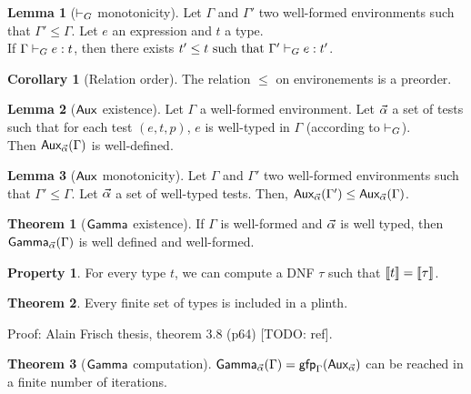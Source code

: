 \documentclass[a4paper]{article}
\theoremstyle{definition}
\newtheorem{theorem}{Theorem}
\newtheorem{lemma}{Lemma}
\newtheorem{property}{Property}
\newtheorem{corollary}{Corollary}
\begin{document}
        \begin{lemma}[$\vdash_G$ monotonicity]
          Let $\Gamma$ and $\Gamma'$ two well-formed environments such that $\Gamma' \leq \Gamma$.
          Let $e$ an expression and $t$ a type.\\
          If $\Gamma \vdash_G e : t$, then there exists $t'\leq t \text{ such that } \Gamma' \vdash_G e : t'$.
        \end{lemma}

        \begin{corollary}[Relation order]
          The relation $\leq$ on environements is a preorder.
        \end{corollary}

        \begin{lemma}[$\textsf{Aux}_{} $ existence]
          Let $\Gamma$ a well-formed environment.
          Let $\vec \alpha$ a set of tests such that for each test $(e,t,p)$, $e$ is well-typed in $\Gamma$ (according to $\vdash_G$).\\
          Then $\textsf{Aux}_{\vec \alpha}(\Gamma)$ is well-defined.
        \end{lemma}

        \begin{lemma}[$\textsf{Aux}_{}$ monotonicity]
          Let $\Gamma$ and $\Gamma'$ two well-formed environments such that $\Gamma' \leq \Gamma$.
          Let $\vec \alpha$ a set of well-typed tests. Then, $\textsf{Aux}_{\vec \alpha}(\Gamma') \leq \textsf{Aux}_{\vec \alpha}(\Gamma)$.
        \end{lemma}

        \begin{theorem}[$\textsf{Gamma}_{}$ existence]
            If $\Gamma$ is well-formed and $\vec \alpha$ is well typed, then $\textsf{Gamma}_{\vec \alpha}(\Gamma)$ is well defined and well-formed.
        \end{theorem}

        \begin{property}
          For every type $t$, we can compute a DNF $\tau$ such that ${\llbracket t \rrbracket} = {\llbracket \tau \rrbracket}$.
        \end{property}

        \begin{theorem}
          Every finite set of types is included in a plinth.
        \end{theorem}
        Proof: Alain Frisch thesis, theorem 3.8 (p64) [TODO: ref].

        \begin{theorem}[$\textsf{Gamma}_{}$ computation]
          $\textsf{Gamma}_{\vec \alpha}(\Gamma)=\textsf{gfp}_\Gamma (\textsf{Aux}_{\vec \alpha})$ can be reached in a finite number of iterations.
        \end{theorem}
\end{document}

